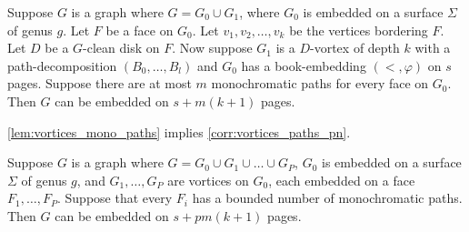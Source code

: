 \begin{lemma}\label{lem:vortices_mono_paths}
	Suppose \(G\) is a graph where $G = G_0 \cup G_1$, where \(G_0\) is embedded on a surface \(\Sigma \) of genus \(g\). Let \(F\) be a face on \(G_0\). Let \(v_1, v_2, \ldots, v_k\) be the vertices bordering \(F\). Let \(D\) be a \(G\)-clean disk on \(F\). Now suppose \(G_1\) is a $D$-vortex of depth $k$ with a path-decomposition \((B_0, \ldots, B_l)\) and \(G_0\) has a book-embedding \((<, \varphi)\) on $s$ pages. Suppose there are at most \(m\) monochromatic paths for every face on $G_0$. Then \(G\) can be embedded on \(s + m(k+1)\) pages.
\end{lemma}

\cref{lem:vortices_mono_paths} implies \cref{corr:vortices_paths_pn}.

\begin{corollary}\label{corr:vortices_paths_pn}
	Suppose $G$ is a graph where $G = G_0 \cup G_1 \cup \ldots \cup G_P$, $G_0$ is embedded on a surface $\Sigma$ of genus $g$, and $G_1, \ldots ,G_P$ are vortices on $G_0$, each embedded on a face $F_1, \ldots, F_P$. Suppose that every $F_i$ has a bounded number of monochromatic paths. Then $G$ can be embedded on $s + pm(k+1)$ pages.
\end{corollary}

